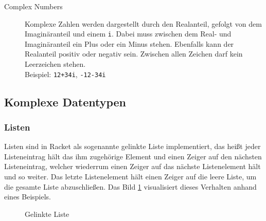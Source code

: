 \begin{description}
\begin{description}
			\item[Complex Numbers] Komplexe Zahlen werden dargestellt durch den Realanteil, gefolgt von dem Imaginäranteil und einem \texttt{i}. Dabei muss zwischen dem Real- und Imaginäranteil ein Plus oder ein Minus stehen. Ebenfalls kann der Realanteil positiv oder negativ sein. Zwischen allen Zeichen darf kein Leerzeichen stehen. \\ Beispiel: \texttt{12+34i}, \texttt{-12-34i}
		\end{description}
\end{description}



\subsection{Komplexe Datentypen}
\subsubsection{Listen}
Listen sind in Racket als sogenannte gelinkte Liste implementiert, das heißt jeder Listeneintrag hält das ihm zugehörige Element und einen Zeiger auf den nächsten Listeneintrag, welcher wiederrum einen Zeiger auf das nächste Listenelement hält und so weiter. Das letzte Listenelement hält einen Zeiger auf die leere Liste, um die gesamte Liste abzuschließen. Das Bild \ref{f:linkedlist} visualisiert dieses Verhalten anhand eines Beispiels.

            \begin{figure}[ht]
                \centering
                \caption{Gelinkte Liste}
                \label{f:linkedlist}
            \end{figure}

